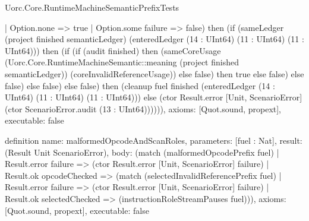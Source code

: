 \begin{lexlean}{Uorc.Core.RuntimeMachineSemanticPrefixTests}
\begin{semanticmodule}
{        | Option.none => true
        | Option.some failure => false) then (if (sameLedger (project finished semanticLedger) (enteredLedger (14 : UInt64) (11 : UInt64) (11 : UInt64))) then (if (if (audit finished) then (sameCoreUsage (Uorc.Core.RuntimeMachineSemantic::meaning (project finished semanticLedger)) (coreInvalidReferenceUsage)) else false) then true else false) else false) else false) else false) then (cleanup fuel finished (enteredLedger (14 : UInt64) (11 : UInt64) (11 : UInt64))) else (ctor Result.error [Unit, ScenarioError] (ctor ScenarioError.audit (13 : UInt64)))))),
  axioms: [Quot.sound, propext],
  executable: false
}

definition{
  name: malformedOpcodeAndScanRoles,
  parameters: [fuel : Nat],
  result: (Result Unit ScenarioError),
  body: (match (malformedOpcodePrefix fuel)
    | Result.error failure => (ctor Result.error [Unit, ScenarioError] failure)
    | Result.ok opcodeChecked => (match (selectedInvalidReferencePrefix fuel)
      | Result.error failure => (ctor Result.error [Unit, ScenarioError] failure)
      | Result.ok selectedChecked => (instructionRoleStreamPauses fuel))),
  axioms: [Quot.sound, propext],
  executable: false
}


\end{semanticmodule}
\end{lexlean}
